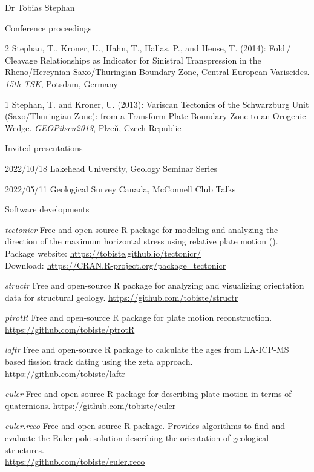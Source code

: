 \documentclass[10pt, paper=letter]{scrartcl} %
\begin{document}
\begin{cv}{Dr Tobias Stephan}
\begin{cvlist}{Conference proceedings}
    \item[2] Stephan, T., Kroner, U., Hahn, T., Hallas, P., and Heuse, T. (2014): Fold\,/ Cleavage Relationships as Indicator for Sinistral Transpression in the Rheno\-/Hercynian\--Saxo\-/Thuringian Boundary Zone, Central European Variscides. \textit{15th TSK}, Potsdam, Germany
    \item[1] Stephan, T. and Kroner, U. (2013): Variscan Tectonics of the Schwarzburg Unit (Saxo\-/Thuringian Zone): from a Transform Plate Boundary Zone to an Orogenic Wedge. \textit{GEOPilsen2013}, Plze\v{n}, Czech Republic
    \end{cvlist}
    
\begin{cvlist}{Invited presentations}
  \item[2022/10/18]{Lakehead University, Geology Seminar Series}
  \item[2022/05/11]{Geological Survey Canada, McConnell Club Talks}
\end{cvlist}

    
\begin{cvlist}{Software developments}
 \item[\textit{tectonicr}] Free and open-source R package for modeling and analyzing the direction of the maximum horizontal stress using relative plate motion ().\\
 Package website: \url{https://tobiste.github.io/tectonicr/}\\
 Download: \url{https://CRAN.R-project.org/package=tectonicr} 
 \item[\textit{structr}] Free and open-source R package for analyzing and visualizing orientation data for structural geology. 
 \url{https://github.com/tobiste/structr}
 \item[\textit{ptrotR}] Free and open-source R package for plate motion reconstruction. 
 \url{https://github.com/tobiste/ptrotR}
 \item[\textit{laftr}] Free and open-source R package to calculate the ages from LA-ICP-MS based fission track dating using the zeta approach. 
 \url{https://github.com/tobiste/laftr}
 \item[\textit{euler}] Free and open-source R package for describing plate motion in terms of quaternions.\newline
 \url{https://github.com/tobiste/euler}
 \item[\textit{euler.reco}] Free and open-source R package. Provides algorithms to find and evaluate the Euler pole solution describing the orientation of geological structures.\\
 \url{https://github.com/tobiste/euler.reco}
\end{cvlist}


\end{cv}
\end{document}
